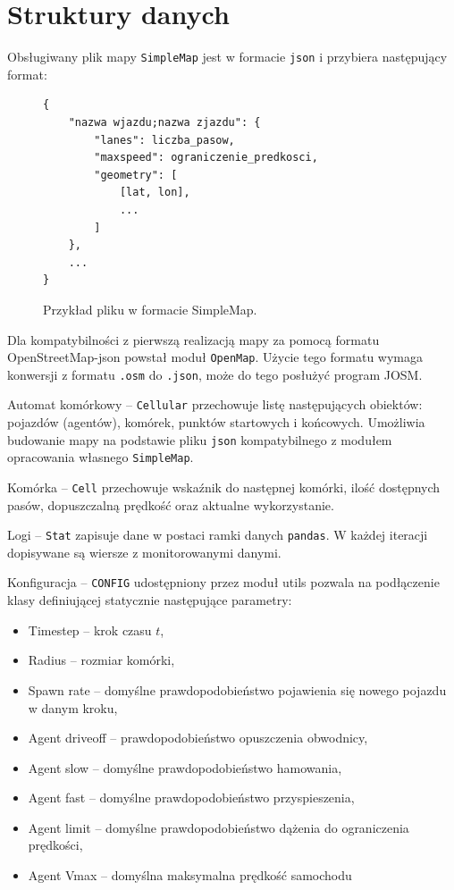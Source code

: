 \documentclass[a4paper,12pt]{article}
\begin{document}
    \section{Struktury danych}
    Obsługiwany plik mapy \texttt{SimpleMap} jest w formacie \texttt{json} i przybiera następujący format:
	\begin{figure}[h]
	    \centering
	    \begin{lstlisting}
{
	"nazwa wjazdu;nazwa zjazdu": {
		"lanes": liczba_pasow,
		"maxspeed": ograniczenie_predkosci,
		"geometry": [
			[lat, lon],
			...
		]
	},
	...
}
	    \end{lstlisting}
	    \caption{Przykład pliku w formacie SimpleMap.}
	    \label{sm-format}
	\end{figure}
	Dla kompatybilności z pierwszą realizacją mapy za pomocą formatu OpenStreetMap-json powstał moduł \texttt{OpenMap}. Użycie tego formatu wymaga konwersji z formatu \texttt{.osm} do \texttt{.json}, może do tego posłużyć program JOSM.
    
    \label{automat}
    Automat komórkowy -- \texttt{Cellular} przechowuje listę następujących obiektów: pojazdów (agentów), komórek, punktów startowych i końcowych.
    Umożliwia budowanie mapy na podstawie pliku \texttt{json} kompatybilnego z modułem opracowania własnego \texttt{SimpleMap}.
    
    Komórka -- \texttt{Cell} przechowuje wskaźnik do następnej komórki, ilość dostępnych pasów, dopuszczalną prędkość oraz aktualne wykorzystanie.
    
    Logi -- \texttt{Stat} zapisuje dane w postaci ramki danych \texttt{pandas}. W każdej iteracji dopisywane są wiersze z monitorowanymi danymi.
    
    \label{logs}
    Konfiguracja -- \texttt{CONFIG} udostępniony przez moduł utils pozwala na podłączenie klasy definiującej statycznie następujące parametry:
    \begin{itemize}
    	\item Timestep -- krok czasu $t$,
    	\item Radius -- rozmiar komórki,
    	\item Spawn rate -- domyślne prawdopodobieństwo pojawienia się nowego pojazdu w danym kroku,
    	\item Agent driveoff -- prawdopodobieństwo opuszczenia obwodnicy,
    	\item Agent slow -- domyślne prawdopodobieństwo hamowania,
    	\item Agent fast -- domyślne prawdopodobieństwo przyspieszenia,
    	\item Agent limit -- domyślne prawdopodobieństwo dążenia do ograniczenia prędkości,
    	\item Agent Vmax -- domyślna maksymalna prędkość samochodu
    \end{itemize}
\end{document}
